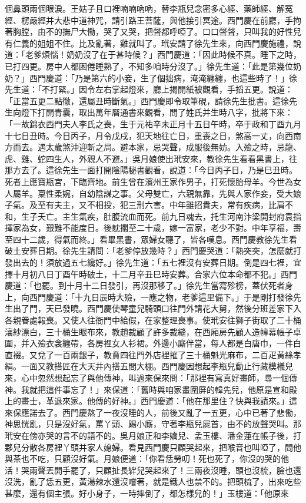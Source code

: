\begin{showcontents}{}
個鼻頭兩個眼淚。王姑子且口裡喃喃吶吶，替李瓶兒念密多心經、藥師經、解冤經、楞嚴經并大悲中道神咒，請引路王菩薩，與他接引冥途。西門慶在前廳，手拘著胸膛，由不的撫尸大慟，哭了又哭，把聲都呼啞了。口口聲聲，只叫我的好性兒有仁義的姐姐不住。比及亂著，雞就叫了。玳安請了徐先生來，向西門慶施禮，說道：「老爹煩惱！奶奶沒了在于甚時候？」西門慶道：「因此時候不真。睡下之時，已打四更。房中人都困倦睡熟了，不知多咱時分沒了。」徐先生道：「此是第幾位奶奶？」西門慶道：「乃是第六的小妾，生了個拙病，淹淹纏纏，也這些時了！」徐先生道：「不打緊。」因令左右掌起燈來，廳上揭開紙被觀看，手搯五更。說道：「正當五更二點徹，還屬丑時斷氣。」西門慶即令取筆硯，請徐先生批書。這徐先生向燈下打開青囊，取出萬年曆通書來觀看，問了姓氏并生時八字，批將下來：「一故錦衣西門夫人李氏之喪，生于元祐辛未正月十五日午時，卒于政和丁酉九月十七日丑時。今日丙子，月令戊戌，犯天地往亡日，重喪之日，煞高一丈，向西南方而去。遇太歲煞沖迎斬之局。避本家，忌哭聲，成服後無妨。入殮之時，忌龍、虎、雞、蛇四生人，外親人不避。」吳月娘使出玳安來，教徐先生看看黑書上，往那方去了。這徐先生一面打開陰陽秘書觀看，說道：「今日丙子日，乃是巳丑時。死者上應寶瓶宮，下臨齊地。前生曾在濱州王家作男子，打死懷胎母羊。今世為女人屬羊。稟性柔婉，自幼陰謀之事。父母雙亡，六親無靠，先與人家作妾，受大娘子氣。及至有夫主，又不相投，犯三刑六害。中年雖招貴夫，常有疾病，比肩不和，生子夭亡。主生氣疾，肚腹流血而死。前九日魂去，托生河南汴梁開封府袁指揮家為女，艱難不能度日。後躭擱至二十歲，嫁一富家，老少不對。中年享福，壽至四十二歲，得氣而終。」看畢黑書，眾婦女聽了，皆各嘆息。西門慶教徐先生看破土安葬日期。徐先生請問：「老爹停放幾時？」西門慶哭道：「熱突突，怎麼就打發出去的！須放過五七纔好。」徐先生道：「五七裡沒有安葬日期。倒是四七裡，宜擇十月初八日丁酉午時破土，十二月辛丑巳時安葬。合家六位本命都不犯。」西門慶道：「也罷。到十月十二日發引，再沒那移了。」徐先生當寫殄榜，蓋伏死者身上，向西門慶道：「十九日辰時大殮，一應之物，老爹這里備下。」于是剛打發徐先生出了門，天已發曉。西門慶使琴童兒騎頭口往門外請花大舅，然後分班差家下入各親眷處報喪。又使人往衙門中給假，在家整理喪事。使玳安往獅子街取了二十桶瀼紗漂白，三十桶生眼布來，教趙裁顧了許多裁縫，在西廂房先顧人造幃幕帳子卓圍，并入殮衣衾纏帶，各房裡女人衫裙。外邊小廝伴當，每人都是白唐巾，一件白直裰。又兌了一百兩銀子，教賁四往門外店裡摧了三十桶魁光麻布，二百疋黃絲孝絹。一面又教搭匠在大天井內搭五間大棚。西門慶因想起李瓶兒動止行藏模檥兒來，心中忽然想起忘了與他傳神，叫過來保來問：「那裡有寫真好畫師，尋一個傳神。我就把這件事忘了！」來保道：「舊時與咱家畫圍屏的韓先兒，他原是宣和殿上的畫士，革退來家。他傳的好神。」西門慶道：「他在那里住？快與我請來。」這來保應諾去了。西門慶熬了一夜沒睡的人，前後又亂了一五更，心中已著了悲慟，神思恍亂，只是沒好氣，罵丫頭、踢小廝，守著李瓶兒屍首，由不的放聲哭叫。那玳安在傍亦哭的言不的語不的。吳月娘正和李嬌兒、孟玉樓、潘金蓮在帳子後，打夥兒分散各房裡丫頭并家人媳婦。看見西門慶只顧哭起來，把喉音也叫啞了，問他與茶也不吃，只顧沒好氣。月娘便道：「你看恁勞叨！死也死了，你沒的哭的他活！哭兩聲丟開手罷了，只顧扯長絆兒哭起來了！三兩夜沒睡，頭也沒梳，臉也還沒洗，亂了恁五更，黃湯辣水還沒嚐著，就是鐵人也禁不的。把頭梳了，出來吃些甚麼，還有個主張。好小身子，一時摔倒了，都怎樣兒的！」玉樓道：「他原來
\end{showcontents}
